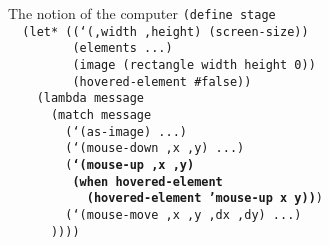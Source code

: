 \begin{frame}{The notion of the computer}
  \scriptsize
  \texttt{(define stage\\
    \ \ (let* ((`(,width ,height) (screen-size))\\
    \ \ \ \ \ \ \ \ \ (elements ...)\\
    \ \ \ \ \ \ \ \ \ (image (rectangle width height 0))\\
    \ \ \ \ \ \ \ \ \ (hovered-element \#false))\\
    \ \ \ \ (lambda message\\
    \ \ \ \ \ \ (match message\\
    \ \ \ \ \ \ \ \ (`(as-image) ...)\\
    \ \ \ \ \ \ \ \ (`(mouse-down ,x ,y) ...)\\
    \ \ \ \ \ \ \ \ (\textbf{`(mouse-up ,x ,y) \\
    \ \ \ \ \ \ \ \ \ (when hovered-element\\
    \ \ \ \ \ \ \ \ \ \ \ (hovered-element 'mouse-up x y))})\\
    \ \ \ \ \ \ \ \ (`(mouse-move ,x ,y ,dx ,dy) ...)\\
    \ \ \ \ \ \ ))))\\
    \ \\
    \ \\
    \ \\
    \ \\
    \ \\
    \ \\
    \ \\
    \ \\
    \ \\
    \ \\
    \ 
}
\end{frame}

